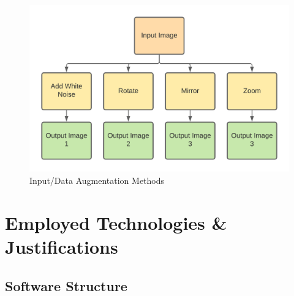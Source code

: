     \begin{figure}[H]
      \begin{center}
        \includegraphics[scale=0.7]{Images/Data_Augmentation}
        \caption{Input/Data Augmentation Methods}
        \label{fig:data_augmentation}
      \end{center}
    \end{figure}
\section{Employed Technologies \& Justifications}
  \subsection{Software Structure}
